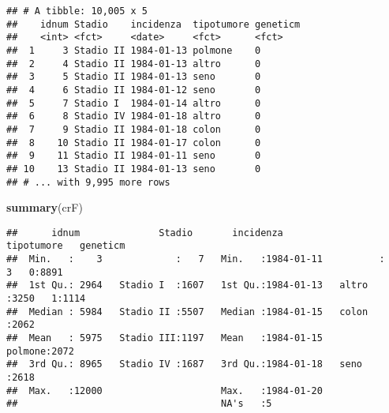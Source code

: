 \documentclass[]{article}
\newenvironment{Shaded}{\begin{snugshade}}{\end{snugshade}}
\newcommand{\DataTypeTok}[1]{\textcolor[rgb]{0.13,0.29,0.53}{#1}}
\newcommand{\KeywordTok}[1]{\textcolor[rgb]{0.13,0.29,0.53}{\textbf{#1}}}
\newcommand{\NormalTok}[1]{#1}
\newcommand{\OperatorTok}[1]{\textcolor[rgb]{0.81,0.36,0.00}{\textbf{#1}}}
\newcommand{\StringTok}[1]{\textcolor[rgb]{0.31,0.60,0.02}{#1}}
\begin{document}
\begin{Shaded}
\end{Shaded}

\begin{verbatim}
## # A tibble: 10,005 x 5
##    idnum Stadio    incidenza  tipotumore geneticm
##    <int> <fct>     <date>     <fct>      <fct>   
##  1     3 Stadio II 1984-01-13 polmone    0       
##  2     4 Stadio II 1984-01-13 altro      0       
##  3     5 Stadio II 1984-01-13 seno       0       
##  4     6 Stadio II 1984-01-12 seno       0       
##  5     7 Stadio I  1984-01-14 altro      0       
##  6     8 Stadio IV 1984-01-18 altro      0       
##  7     9 Stadio II 1984-01-18 colon      0       
##  8    10 Stadio II 1984-01-17 colon      0       
##  9    11 Stadio II 1984-01-11 seno       0       
## 10    13 Stadio II 1984-01-13 seno       0       
## # ... with 9,995 more rows
\end{verbatim}

\begin{Shaded}
\begin{Highlighting}[]
\KeywordTok{summary}\NormalTok{(crF)}
\end{Highlighting}
\end{Shaded}

\begin{verbatim}
##      idnum              Stadio       incidenza            tipotumore   geneticm
##  Min.   :    3             :   7   Min.   :1984-01-11          :   3   0:8891  
##  1st Qu.: 2964   Stadio I  :1607   1st Qu.:1984-01-13   altro  :3250   1:1114  
##  Median : 5984   Stadio II :5507   Median :1984-01-15   colon  :2062           
##  Mean   : 5975   Stadio III:1197   Mean   :1984-01-15   polmone:2072           
##  3rd Qu.: 8965   Stadio IV :1687   3rd Qu.:1984-01-18   seno   :2618           
##  Max.   :12000                     Max.   :1984-01-20                          
##                                    NA's   :5
\end{verbatim}
\end{document}
